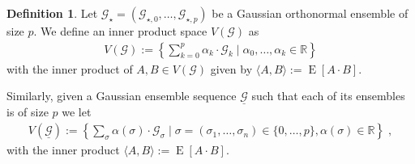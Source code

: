 \documentclass{daj}
\newcommand{\1}{\mathbbm{1}}
\theoremstyle{plain}
\theoremstyle{definition}
\newtheorem{definition}[theorem]{Definition}
\DeclareMathOperator*{\EE}{E}
\begin{document}
\begin{definition}
\label{def:vg}
Let $\mathcal{G_\star} = (\mathcal{G}_{\star,0}, \ldots, \mathcal{G}_{\star, p})$ be a Gaussian 
orthonormal ensemble of size $p$. We define
an inner product space $V(\mathcal{G})$ as
\begin{align*}
  V({\mathcal{G}}) := \left\{
    \sum_{k=0}^p \alpha_k \cdot \mathcal{G}_k \mid 
    \alpha_0, \ldots, \alpha_k \in \mathbb{R}
  \right\}
\end{align*}
with the inner product of $A, B \in V(\mathcal{G})$ given by
$\langle A, B \rangle := \EE[ A \cdot B ]$.

Similarly, given a Gaussian ensemble sequence 
$\underline{\mathcal{G}}$ such that each of its ensembles is of size $p$
we let
\begin{align*}
  V(\underline{\mathcal{G}}) := \left\{
    \sum_{\sigma} \alpha(\sigma) \cdot \mathcal{G}_\sigma
    \mid \sigma = (\sigma_1, \ldots, \sigma_n) \in \{0, \ldots, p\}, 
    \alpha(\sigma) \in \mathbb{R}
  \right\} \; ,
\end{align*}
with the inner product $\langle A, B \rangle := \EE[ A \cdot B ]$.
\end{definition}
\end{document}
